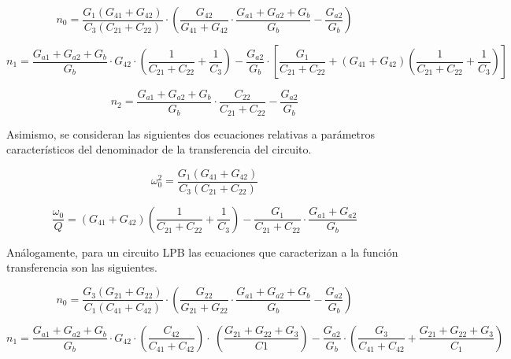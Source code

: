\begin{equation}
\label{hpbn0}
n_0 = \frac{G_1 \left( G_{41} + G_{42} \right)}{C_3 \left( C_{21} + C_{22} \right)} \cdot \left( \frac{G_{42}}{G_{41} + G_{42}} \cdot \frac{G_{a1} + G_{a2} + G_b}{G_b} - \frac{G_{a2}}{G_b} \right)
\end{equation}

\begin{equation}
\label{hpbn1}
n_1 = \frac{G_{a1} + G_{a2} + G_b}{G_b} \cdot G_{42} \cdot \left( \frac{1}{C_{21}+C_{22}} + \frac{1}{C_3} \right) - \frac{G_{a2}}{G_b} \cdot \left[ \frac{G_1}{C_{21}+C_{22}} + \left( G_{41} + G_{42} \right) \left(  \frac{1}{C_{21}+C_{22}} + \frac{1}{C_3} \right) \right]
\end{equation}

\begin{equation}
\label{hpbn2}
n_ 2 = \frac{G_{a1} + G_{a2} + G_b}{G_b} \cdot \frac{C_{22}}{C_{21}+C_{22}} - \frac{G_{a2}}{G_b}
\end{equation}

Asimismo, se consideran las siguientes dos ecuaciones relativas a par\'ametros caracter\'isticos del denominador de la transferencia del circuito.

\begin{equation}
\label{hpbw0}
\omega_0^2 = \frac{G_1 \left( G_{41} + G_{42} \right)}{C_3 \left( C_{21} + C_{22} \right)}
\end{equation}

\begin{equation}
\label{hpbwoQ}
\frac{\omega_0}{Q} = \left( G_{41} + G_{42} \right) \left(  \frac{1}{C_{21}+C_{22}} + \frac{1}{C_3} \right) - \frac{G_1}{C_{21}+C_{22}} \cdot \frac{G_{a1} + G_{a2}}{G_b}
\end{equation}

An\'alogamente, para un circuito LPB las ecuaciones que caracterizan a la funci\'on transferencia son las siguientes.

\begin{equation}
\label{lpbn0}
n_0 = \frac{G_3 \left( G_{21} + G_{22} \right)}{C_1 \left( C_{41} + C_{42} \right)} \cdot \left( \frac{G_{22}}{G_{21} + G_{22}} \cdot \frac{G_{a1} + G_{a2} + G_b}{G_b} - \frac{G_{a2}}{G_b} \right)
\end{equation}

\begin{equation}
\label{lpbn1}
n_1 = \frac{G_{a1} + G_{a2} + G_b}{G_b} \cdot G_{42} \cdot \left( \frac{C_{42}}{C_{41}+C_{42}} \right) \cdot\ \left( \frac{G_{21}+G_{22}+G_{3}}{C1} \right) - \frac{G_{a2}}{G_b} \cdot \left( \frac{G_3}{C_{41}+C_{42}} + \frac{G_{21}+G_{22}+G_3}{C_1}\right)
\end{equation}

